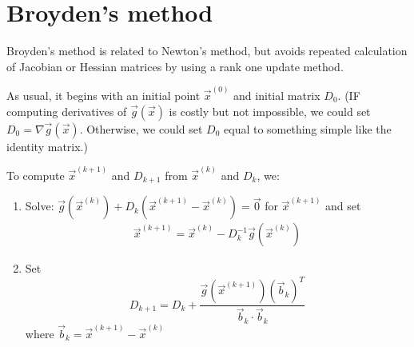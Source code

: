 \documentclass[11pt]{elegantbook}
\begin{document}
\section{Broyden's method}
Broyden's method is related to Newton's method, but avoids repeated calculation of Jacobian or Hessian matrices by using a rank one update method.

\begin{definition}
    As usual, it begins with an initial point $\vec{x}^{(0)}$ and initial matrix $D_0$. (IF computing derivatives of $\vec{g}(\vec{x})$ is costly but not impossible, we could set $D_0= \nabla \vec{g}(\vec{x})$. Otherwise, we could set $D_0$ equal to something simple like the identity matrix.)

    To compute $\vec{x}^{(k+1)}$ and $D_{k+1}$ from $\vec{x}^{(k)}$ and $D_k$, we:
    \begin{enumerate}
        \item Solve: $\vec{g}(\vec{x}^{(k)})+D_k(\vec{x}^{(k+1)}-\vec{x}^{(k)})=\vec{0}$ for $\vec{x}^{(k+1)}$ and set
        \begin{equation}
            \begin{aligned}
                \vec{x}^{(k+1)}=\vec{x}^{(k)}-D_k^{-1}\vec{g}(\vec{x}^{(k)})
            \end{aligned}
            \nonumber
        \end{equation}
        \item Set $$D_{k+1}=D_k+\frac{\vec{g}(\vec{x}^{(k+1)})(\vec{b}_k)^T}{\vec{b}_k\cdot\vec{b}_k}$$ where $\vec{b}_k=\vec{x}^{(k+1)}-\vec{x}^{(k)}$
    \end{enumerate}
\end{definition}
\end{document}
